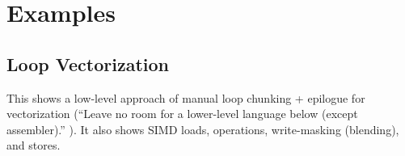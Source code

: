 \section{Examples}\label{sec:Examples}

\subsection{Loop Vectorization}
This shows a low-level approach of manual loop chunking + epilogue for vectorization (“Leave no room for a lower-level language below \CC{} (except assembler).” \parencite{str99}).
It also shows SIMD loads, operations, write-masking (blending), and stores.
\medskip




